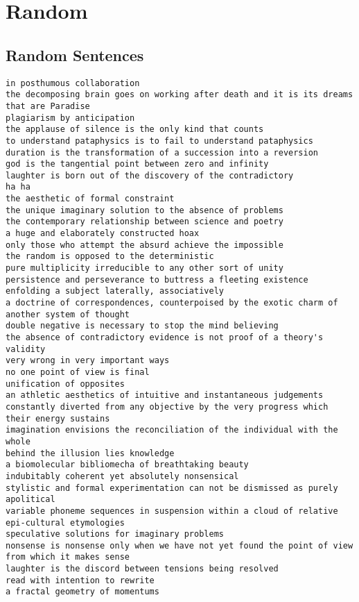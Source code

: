 
\chapter{Random}
\label{app:random}


\section{Random Sentences}
\label{s:appsentences}

\begin{verbatim}
in posthumous collaboration
the decomposing brain goes on working after death and it is its dreams that are Paradise
plagiarism by anticipation
the applause of silence is the only kind that counts
to understand pataphysics is to fail to understand pataphysics
duration is the transformation of a succession into a reversion
god is the tangential point between zero and infinity
laughter is born out of the discovery of the contradictory
ha ha
the aesthetic of formal constraint
the unique imaginary solution to the absence of problems
the contemporary relationship between science and poetry
a huge and elaborately constructed hoax
only those who attempt the absurd achieve the impossible
the random is opposed to the deterministic
pure multiplicity irreducible to any other sort of unity
persistence and perseverance to buttress a fleeting existence
enfolding a subject laterally, associatively
a doctrine of correspondences, counterpoised by the exotic charm of another system of thought
double negative is necessary to stop the mind believing
the absence of contradictory evidence is not proof of a theory's validity
very wrong in very important ways
no one point of view is final
unification of opposites
an athletic aesthetics of intuitive and instantaneous judgements
constantly diverted from any objective by the very progress which their energy sustains
imagination envisions the reconciliation of the individual with the whole
behind the illusion lies knowledge
a biomolecular bibliomecha of breathtaking beauty
indubitably coherent yet absolutely nonsensical
stylistic and formal experimentation can not be dismissed as purely apolitical
variable phoneme sequences in suspension within a cloud of relative epi-cultural etymologies
speculative solutions for imaginary problems
nonsense is nonsense only when we have not yet found the point of view from which it makes sense
laughter is the discord between tensions being resolved
read with intention to rewrite
a fractal geometry of momentums

\end{verbatim}
